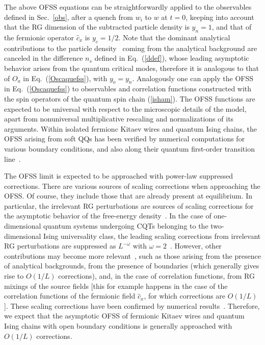 The above OFSS equations can be straightforwardly applied to the
observables defined in Sec.~\ref{obs}, after a quench from $w_i$ to
$w$ at $t=0$, keeping into account that the RG dimension of the
subtracted particle density is $y_n = 1$, and that of the fermionic
operator $\hat c_x$ is $y_c=1/2$.  Note that the dominant analytical
contributions to the particle density~\cite{CPV-14,RV-21} coming from
the analytical background are canceled in the difference $n_s$ defined
in Eq.~(\ref{ddef}), whose leading asymptotic behavior arises from the
quantum critical modes, therefore it is analogous to that of $O_a$ in
Eq.~(\ref{Oscaquefss}), with $y_o=y_n$.  Analogously one can apply the
OFSS in Eq.~(\ref{Oscaquefss}) to observables and correlation
functions constructed with the spin operators of the quantum spin
chain (\ref{isham}).  The OFSS functions are expected to be universal
with respect to the microscopic details of the model, apart from
nonuniversal multiplicative rescaling and normalizations of its
arguments.  Within isolated fermionc Kitaev wires and quantum Ising
chains, the OFSS arising from soft QQs has been verified by numerical
computations for various boundary conditions, and also along their
quantum first-order transition line~\cite{PRV-18,RV-21}.





The OFSS limit is expected to be approached with power-law suppressed
corrections.  There are various sources of scaling corrections when
approaching the OFSS. Of course, they include those that are already
present at equilibrium. In particular, the irrelevant RG perturbations
are sources of scaling corrections for the asymptotic behavior of the
free-energy density~\cite{PV-02,RV-21}.  In the case of
one-dimensional quantum systems undergoing CQTs belonging to the
two-dimensional Ising universality class, the leading scaling
corrections from irrelevant RG perturbations are suppressed as
$L^{-\omega}$ with $\omega=2$~\cite{CHPV-02,CPV-14}. However, other
contributions may become more relevant~\cite{PV-02,CPV-14,RV-21}, such
as those arising from the presence of analytical backgrounds, from the
presence of boundaries (which generally gives rise to $O(1/L)$
corrections), and, in the case of correlation functions, from RG
mixings of the source fields [this for example happens in the case of
  the correlation functions of the fermionic field $\hat{c}_x$, for
  which corrections are $O(1/L)$].  These scaling corrections have
been confirmed by numerical results~\cite{CPV-14,RV-21}. Therefore, we
expect that the asymptotic OFSS of fermionic Kitaev wires and quantum
Ising chains with open boundary conditions is generally approached
with $O(1/L)$ corrections.




